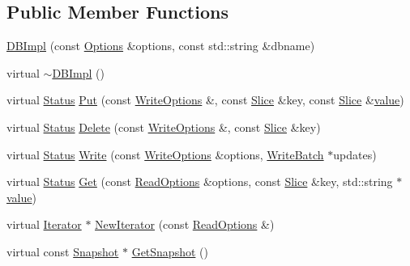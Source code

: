 \subsection*{Public Member Functions}
\begin{DoxyCompactItemize}
\item 
\mbox{\hyperlink{classleveldb_1_1_d_b_impl_a269b55605b27271d6ca5fee68af0d8f3}{D\+B\+Impl}} (const \mbox{\hyperlink{structleveldb_1_1_options}{Options}} \&options, const std\+::string \&dbname)
\item 
virtual \mbox{\hyperlink{classleveldb_1_1_d_b_impl_a07a233a94a2531aed9d3718c9b9ed40d}{$\sim$\+D\+B\+Impl}} ()
\item 
virtual \mbox{\hyperlink{classleveldb_1_1_status}{Status}} \mbox{\hyperlink{classleveldb_1_1_d_b_impl_ad0d56aeb4d84ff9632c9a7f3f1b7c4d5}{Put}} (const \mbox{\hyperlink{structleveldb_1_1_write_options}{Write\+Options}} \&, const \mbox{\hyperlink{classleveldb_1_1_slice}{Slice}} \&key, const \mbox{\hyperlink{classleveldb_1_1_slice}{Slice}} \&\mbox{\hyperlink{version__set_8cc_a38c8b88c432e666ad10b0c5573e1160a}{value}})
\item 
virtual \mbox{\hyperlink{classleveldb_1_1_status}{Status}} \mbox{\hyperlink{classleveldb_1_1_d_b_impl_af050f77e8c22bd6638fed5a46a59399d}{Delete}} (const \mbox{\hyperlink{structleveldb_1_1_write_options}{Write\+Options}} \&, const \mbox{\hyperlink{classleveldb_1_1_slice}{Slice}} \&key)
\item 
virtual \mbox{\hyperlink{classleveldb_1_1_status}{Status}} \mbox{\hyperlink{classleveldb_1_1_d_b_impl_ac0d0b472717099d6a02ad9dace4e8ef4}{Write}} (const \mbox{\hyperlink{structleveldb_1_1_write_options}{Write\+Options}} \&options, \mbox{\hyperlink{classleveldb_1_1_write_batch}{Write\+Batch}} $\ast$updates)
\item 
virtual \mbox{\hyperlink{classleveldb_1_1_status}{Status}} \mbox{\hyperlink{classleveldb_1_1_d_b_impl_a089964ddcd1f5dc85e73499ae57be508}{Get}} (const \mbox{\hyperlink{structleveldb_1_1_read_options}{Read\+Options}} \&options, const \mbox{\hyperlink{classleveldb_1_1_slice}{Slice}} \&key, std\+::string $\ast$\mbox{\hyperlink{version__set_8cc_a38c8b88c432e666ad10b0c5573e1160a}{value}})
\item 
virtual \mbox{\hyperlink{classleveldb_1_1_iterator}{Iterator}} $\ast$ \mbox{\hyperlink{classleveldb_1_1_d_b_impl_ae955dc8f2a1c38588723a0882653cb58}{New\+Iterator}} (const \mbox{\hyperlink{structleveldb_1_1_read_options}{Read\+Options}} \&)
\item 
virtual const \mbox{\hyperlink{classleveldb_1_1_snapshot}{Snapshot}} $\ast$ \mbox{\hyperlink{classleveldb_1_1_d_b_impl_a4bec3d8ffd65fec562b2dd1f6eaba137}{Get\+Snapshot}} ()

\end{DoxyCompactItemize}
